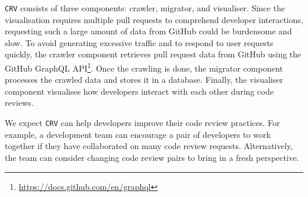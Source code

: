 \documentclass[sigconf]{acmart}
\newcommand{\service}{{\tt CRV}\xspace}
\begin{document}
\service  consists of three components: crawler, migrator, and visualiser.
Since the visualisation requires multiple pull requests to comprehend developer interactions, requesting such a large amount of data from GitHub could be burdensome and slow.
To avoid generating excessive traffic and to respond to user requests quickly, the crawler component retrieves pull request data from GitHub using the GitHub GraphQL API\footnote{\url{https://docs.github.com/en/graphql}}.
Once the crawling is done, the migrator component processes the crawled data and stores it in a database.
Finally, the visualiser component visualises how developers interact with each other during code reviews.

We expect \service can help developers improve their code review practices.
For example, a development team can encourage a pair of developers to work together if they have collaborated on many code review requests.
Alternatively, the team can consider changing code review pairs to bring in a fresh perspective.

%
%
%
%
%
\end{document}
